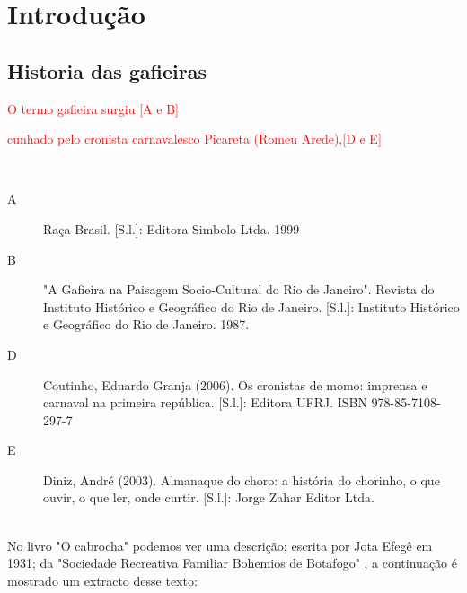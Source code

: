 
\chapter{Introdução}

\section{Historia das gafieiras}

\textcolor{red}{O termo gafieira surgiu [A e B]}

\textcolor{red}{cunhado pelo cronista carnavalesco Picareta (Romeu Arede),[D e E]}


~\\


\begin{description}
\item [A] Raça Brasil. [S.l.]: Editora Simbolo Ltda. 1999

\item [B] "A Gafieira na Paisagem Socio-Cultural do Rio de Janeiro". Revista do Instituto Histórico e Geográfico do Rio de Janeiro. [S.l.]: Instituto Histórico e Geográfico do Rio de Janeiro. 1987.



\item [D] Coutinho, Eduardo Granja (2006). Os cronistas de momo: imprensa e carnaval na primeira república. [S.l.]: Editora UFRJ. ISBN 978-85-7108-297-7

\item [E] Diniz, André (2003). Almanaque do choro: a história do chorinho, o que ouvir, o que ler, onde curtir. [S.l.]: Jorge Zahar Editor Ltda.

\end{description}

~\\


No livro "O cabrocha" podemos ver uma descrição; escrita  por Jota Efegê em 1931; 
da "Sociedade Recreativa Familiar Bohemios de Botafogo" \cite{jotaefege},
a continuação é mostrado um extracto desse texto:

